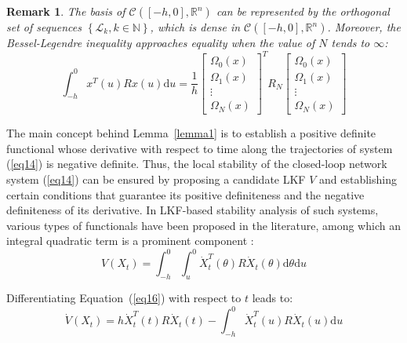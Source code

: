 \documentclass[a4paper]{cas-sc}
\newtheorem{remark}[theorem]{Remark}
\begin{document}
\begin{remark}
  The basis of $\mathcal{C}\left( {\left[ { - h,0} \right],{\mathbb{R}^n}} \right)$ can be represented by the orthogonal set of sequences $\left\{ {{\mathcal{L}_k},k \in \mathbb{N}} \right\}$, which is dense in $\mathcal{C}\left( {\left[ { - h,0} \right],{\mathbb{R}^n}} \right)$. Moreover, the Bessel-Legendre inequality approaches equality when the value of $N$ tends to $\infty$:
  \begin{equation}
    \int_{ - h}^0 {{x^T}} (u)Rx(u){\text{d}}u = \frac{1}{h}{\left[ {\begin{array}{*{20}{c}}
              {{\Omega _0}(x)} \\
              {{\Omega _1}(x)} \\
              \vdots           \\
              {{\Omega _N}(x)}
            \end{array}} \right]^T}{R_N}\left[ {\begin{array}{*{20}{c}}
            {{\Omega _0}(x)} \\
            {{\Omega _1}(x)} \\
            \vdots           \\
            {{\Omega _N}(x)}
          \end{array}} \right]
  \end{equation}
\end{remark}


The main concept behind Lemma~\ref{lemma1} is to establish a positive definite functional whose derivative with respect to time along the trajectories of system (\ref{eq14}) is negative definite. Thus, the local stability of the closed-loop network system (\ref{eq14}) can be ensured by proposing a candidate LKF $V$ and establishing certain conditions that guarantee its positive definiteness and the negative definiteness of its derivative. In LKF-based stability analysis of such systems, various types of functionals have been proposed in the literature, among which an integral quadratic term is a prominent component \citep{Fridman2003}:
\begin{equation}
  V\left( {{X_t}} \right) = \int_{ - h}^0 {\int_u^0 {\dot X_t^T} } (\theta )R{\dot X_t}(\theta ){\text{d}}\theta {\text{d}}u
  \label{eq16}
\end{equation}

Differentiating Equation~(\ref{eq16}) with respect to $t$ leads to:
\begin{equation}
  \dot V\left( {{X_t}} \right) = h\dot X_t^T(t)R{\dot X_t}(t) - \int_{ - h}^0 {\dot X_t^T} (u)R{\dot X_t}(u){\text{d}}u
  \label{eq17}
\end{equation}
\end{document}

